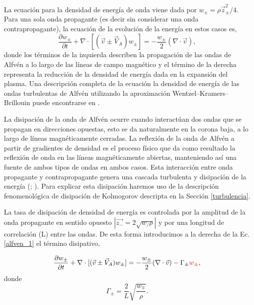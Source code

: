 \documentclass[a4paper,11pt]{report}
\begin{document}
La ecuación para la densidad de energía de onda viene dada por $w_\pm = \rho \vec{z}^2_\pm /4$. Para una sola onda propagante (es decir sin considerar una onda contrapropagante), la ecuación de la evolución de la energía en estos casos es,
\begin{equation}
  \frac{\partial w_\pm}{\partial t} + \nabla \cdot [(\vec{v}\pm \vec{V}_A)w_\pm] = - \frac{w_\pm}{2}(\nabla \cdot \vec{v}) ,\label{alfven_1}
\end{equation}
donde los términos de la izquierda describen la propagación de las ondas de Alfvén a lo largo de las líneas de campo magnético y el término de la derecha representa la reducción de la densidad de energía dada en la expansión del plasma. Una descripción completa de la ecuación la densidad de energía de las ondas turbulentas de Alfvén utilizando la aproximación Wentzel–Kramers–Brillouin puede encontrarse en \citet{vander_2014}.%


La disipación de la onda de Alfvén ocurre cuando interactúan dos ondas que se propagan en direcciones opuestas, esto se da naturalmente en la corona baja, a lo largo de líneas magnéticamente cerradas.
La reflexión de la onda de Alfvén a partir de gradientes de densidad es el proceso físico que da como resultado la reflexión de onda en las líneas magnéticamente abiertas, manteniendo así una fuente de ambos tipos de ondas en ambos casos. Esta interacción entre onda propagante y contrapropagante genera una cascada turbulenta y disipación de la energía (\citet{hollweg_1986}; \citet{dmitruk_2002}). Para explicar esta disipación haremos uso de la descripción fenomenológica de disipación de Kolmogorov descripta en la Sección \ref{turbulencia}.

La tasa de disipación de densidad de energía es controlada por la amplitud de la onda propagante en sentido opuesto $|\vec{z_-} = 2 \sqrt{w_/\rho}|$ y por una longitud de correlación (L) entre las ondas. De esta forma introducimos a la derecha de la Ec. \ref{alfven_1} el término disipativo,

\begin{equation}
  \frac{\partial w_\pm}{\partial t} + \nabla \cdot [(\vec{v}\pm \vec{V}_A)w_\pm] = - \frac{w_\pm}{2}(\nabla \cdot \vec{v}) - \Gamma_{\pm} \textcolor{red}{ w_\pm},\label{alfven_2}
\end{equation}
donde
\begin{equation}
  \Gamma_{\pm} = \frac{2}{L}\sqrt{\frac{w_{\mp}}{\rho}}.
\end{equation}
\end{document}
